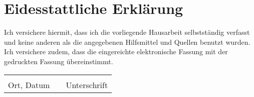 \documentclass[Thesis.tex]{subfiles}
\begin{document}
\section*{Eidesstattliche Erklärung}
\label{sec:eidesstattliche-eklärung}
Ich versichere hiermit, dass ich die vorliegende Hausarbeit selbstständig verfasst und keine anderen als die angegebenen Hilfsmittel und Quellen benutzt wurden.
Ich versichere zudem, dass die eingereichte elektronische Fassung mit der gedruckten Fassung übereinstimmt.

\vspace*{3cm}

\begin{center}
  \begin{tabular}{cp{3cm}c}
    \underline{\hspace{5cm}}  & & \underline{\hspace{5cm}} \\
    Ort, Datum                & & Unterschrift \\
  \end{tabular}
\end{center}
\end{document}

